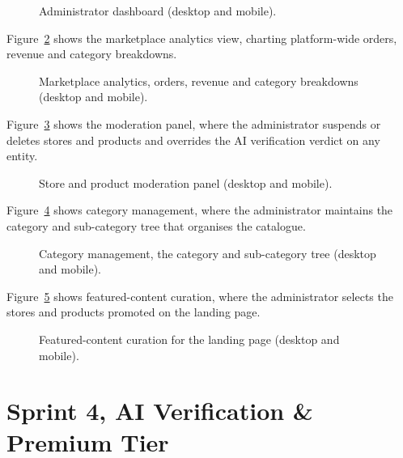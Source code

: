 \begin{figure}[H]
  \centering
  \caption{Administrator dashboard (desktop and mobile).}
  \label{fig:real-admindash}
\end{figure}

Figure~\ref{fig:real-adminanalytics} shows the marketplace analytics view,
charting platform-wide orders, revenue and category breakdowns.

\begin{figure}[H]
  \centering
  \caption{Marketplace analytics, orders, revenue and category breakdowns (desktop and mobile).}
  \label{fig:real-adminanalytics}
\end{figure}

Figure~\ref{fig:real-moderation} shows the moderation panel, where the
administrator suspends or deletes stores and products and overrides the AI
verification verdict on any entity.

\begin{figure}[H]
  \centering
  \caption{Store and product moderation panel (desktop and mobile).}
  \label{fig:real-moderation}
\end{figure}

Figure~\ref{fig:real-categories} shows category management, where the
administrator maintains the category and sub-category tree that organises
the catalogue.

\begin{figure}[H]
  \centering
  \caption{Category management, the category and sub-category tree (desktop and mobile).}
  \label{fig:real-categories}
\end{figure}

Figure~\ref{fig:real-featured} shows featured-content curation, where the
administrator selects the stores and products promoted on the landing
page.

\begin{figure}[H]
  \centering
  \caption{Featured-content curation for the landing page (desktop and mobile).}
  \label{fig:real-featured}
\end{figure}

\section{Sprint 4, AI Verification \& Premium Tier}

